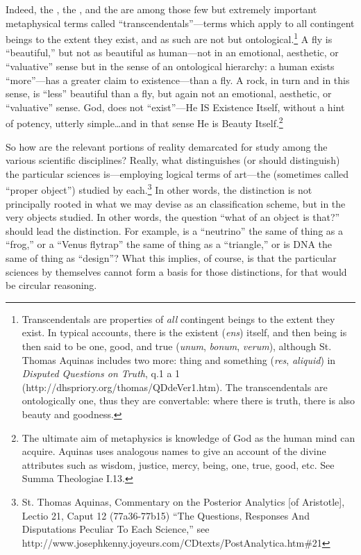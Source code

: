 Indeed, the , the , and the  are among those few but extremely important metaphysical terms called ``transcendentals''---terms which apply to all contingent beings to the extent they exist, and as such are not  but ontological.\footnote{Transcendentals are properties of \textit{all} contingent beings to the extent they exist. In typical accounts, there is the existent (\textit{ens}) itself, and then being is then said to be one, good, and true (\textit{unum}, \textit{bonum}, \textit{verum}), although St. Thomas Aquinas includes two more: thing and something (\textit{res}, \textit{aliquid}) in \textit{Disputed Questions on Truth}, q.1 a 1 (http://dhspriory.org/thomas/QDdeVer1.htm).  The transcendentals are ontologically one, thus they are convertable: where there is truth, there is also beauty and goodness.} A fly is ``beautiful,'' but not as beautiful as human---not in an emotional, aesthetic, or ``valuative'' sense but in the sense of an ontological hierarchy: a human exists ``more''---has a greater claim to existence---than a fly. A rock, in turn and in this sense, is ``less'' beautiful than a fly, but again not an emotional, aesthetic, or ``valuative'' sense. God, does not ``exist''---He IS Existence Itself, without a hint of potency, utterly simple\ldots and in that sense He is Beauty Itself.\footnote{The ultimate aim of metaphysics is knowledge of God as the human mind can acquire. Aquinas uses analogous names to give an account of the divine attributes such as wisdom, justice, mercy, being, one, true, good, etc. See Summa Theologiae I.13.}

So how are the relevant portions of reality demarcated for study among the various scientific disciplines? Really, what distinguishes (or should distinguish) the particular sciences is---employing logical terms of art---the  (sometimes called ``proper object'') studied by each.\footnote{St. Thomas Aquinas, Commentary on the Posterior Analytics [of Aristotle], Lectio 21, Caput 12 (77a36-77b15) ``The Questions, Responses And Disputations Peculiar To Each Science,'' see http://www.josephkenny.joyeurs.com/CDtexts/PostAnalytica.htm\#21} In other words, the distinction is not principally rooted in what we may devise as an  classification scheme, but in the very objects studied. In other words, the question ``what  of an object is that?'' should lead the distinction. For example, is a ``neutrino'' the same  of thing as a ``frog,'' or a ``Venus flytrap'' the same  of thing as a ``triangle,'' or is DNA the same  of thing as ``design''? What this implies, of course, is that the particular sciences by themselves cannot form a basis for those distinctions, for that would be circular reasoning.

